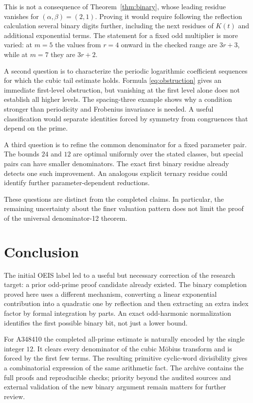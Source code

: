 \documentclass[11pt,a4paper]{article}
\numberwithin{equation}{section}
\theoremstyle{definition}
\theoremstyle{remark}
\begin{document}
This is not a consequence of Theorem~\ref{thm:binary}, whose leading residue
vanishes for $(\alpha,\beta)=(2,1)$. Proving it would require following the
reflection calculation several binary digits further, including the next
residues of $K(t)$ and additional exponential terms. The statement for a
fixed odd multiplier is more varied: at $m=5$ the values from $r=4$ onward
in the checked range are $3r+3$, while at $m=7$ they are $3r+2$.

A second question is to characterize the periodic logarithmic coefficient
sequences for which the cubic tail estimate holds. Formula
\eqref{eq:obstruction} gives an immediate first-level obstruction, but
vanishing at the first level alone does not establish all higher levels.
The spacing-three example shows why a condition stronger than periodicity
and Frobenius invariance is needed. A useful classification would separate
identities forced by symmetry from congruences that depend on the prime.

A third question is to refine the common denominator for a fixed parameter
pair. The bounds $24$ and $12$ are optimal uniformly over the stated classes,
but special pairs can have smaller denominators. The exact first binary
residue already detects one such improvement. An analogous explicit
ternary residue could identify further parameter-dependent reductions.

These questions are distinct from the completed claims. In particular,
the remaining uncertainty about the finer valuation pattern does not limit
the proof of the universal denominator-12 theorem.

\section{Conclusion}

The initial OEIS label led to a useful but necessary correction of the
research target: a prior odd-prime proof candidate already existed. The
binary completion proved here uses a different mechanism, converting a
linear exponential contribution into a quadratic one by reflection and
then extracting an extra index factor by formal integration by parts.
An exact odd-harmonic normalization identifies the first possible binary
bit, not just a lower bound.

For A348410 the completed all-prime estimate is naturally encoded by the
single integer $12$. It clears every denominator of the cubic M\"obius
transform and is forced by the first few terms. The resulting primitive
cyclic-word divisibility gives a combinatorial expression of the same
arithmetic fact. The archive contains the full proofs and reproducible
checks; priority beyond the audited sources and external validation of the
new binary argument remain matters for further review.
\end{document}
